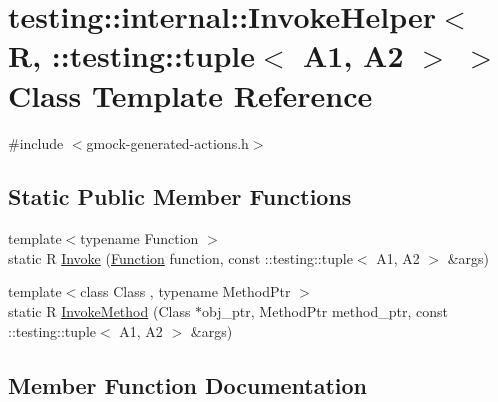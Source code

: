 \hypertarget{classtesting_1_1internal_1_1_invoke_helper_3_01_r_00_01_1_1testing_1_1tuple_3_01_a1_00_01_a2_01_4_01_4}{}\section{testing\+:\+:internal\+:\+:Invoke\+Helper$<$ R, \+:\+:testing\+:\+:tuple$<$ A1, A2 $>$ $>$ Class Template Reference}
\label{classtesting_1_1internal_1_1_invoke_helper_3_01_r_00_01_1_1testing_1_1tuple_3_01_a1_00_01_a2_01_4_01_4}


{\ttfamily \#include $<$gmock-\/generated-\/actions.\+h$>$}

\subsection*{Static Public Member Functions}
\begin{DoxyCompactItemize}
\item 
{\footnotesize template$<$typename Function $>$ }\\static R \hyperlink{classtesting_1_1internal_1_1_invoke_helper_3_01_r_00_01_1_1testing_1_1tuple_3_01_a1_00_01_a2_01_4_01_4_af3863b86ae4b7fbfd5a5f14e20b57423}{Invoke} (\hyperlink{structtesting_1_1internal_1_1_function}{Function} function, const \+::testing\+::tuple$<$ A1, A2 $>$ \&args)
\item 
{\footnotesize template$<$class Class , typename Method\+Ptr $>$ }\\static R \hyperlink{classtesting_1_1internal_1_1_invoke_helper_3_01_r_00_01_1_1testing_1_1tuple_3_01_a1_00_01_a2_01_4_01_4_a227b8f07bfda13f6cb390655fc84f1ee}{Invoke\+Method} (Class $\ast$obj\+\_\+ptr, Method\+Ptr method\+\_\+ptr, const \+::testing\+::tuple$<$ A1, A2 $>$ \&args)
\end{DoxyCompactItemize}


\subsection{Member Function Documentation}
\mbox{\label{classtesting_1_1internal_1_1_invoke_helper_3_01_r_00_01_1_1testing_1_1tuple_3_01_a1_00_01_a2_01_4_01_4_af3863b86ae4b7fbfd5a5f14e20b57423}} 
